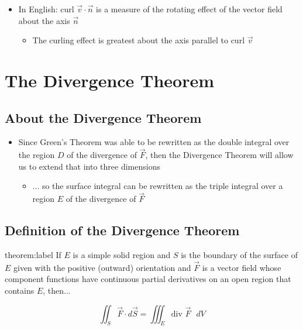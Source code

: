 \documentclass{package/notes}
\begin{document}
\begin{itemize}
	\item In English: $\text{curl } \vec{v} \cdot \vec{n}$ is a measure of the rotating effect of the vector field about the axis $\vec{n}$
	\begin{itemize}
		\item The curling effect is greatest about the axis parallel to $\text{curl } \vec{v}$ 
	\end{itemize}
\end{itemize}




\section{The Divergence Theorem}


\subsection{About the Divergence Theorem}

\begin{itemize}
	\item Since Green's Theorem was able to be rewritten as the double integral over the region $D$ of the divergence of $\vec{F}$, then the Divergence Theorem will allow us to extend that into three dimensions
	\begin{itemize}
		\item ... so the surface integral can be rewritten as the triple integral over a region $E$ of the divergence of $\vec{F}$ 
	\end{itemize}
\end{itemize}


\newpage
\subsection{Definition of the Divergence Theorem}

\begin{theorem}{theorem:label}
	If $E$ is a simple solid region and $S$ is the boundary of the surface of $E$ given with the positive (outward) orientation and $\vec{F}$ is a vector field whose component functions have continuous partial derivatives on an open region that contains $E$, then...

	$$\iint_S\vec{F} \cdot d\vec{S} = \iiint_E \text{div } \vec{F} \text{ }dV$$
\end{theorem}
\end{document}
